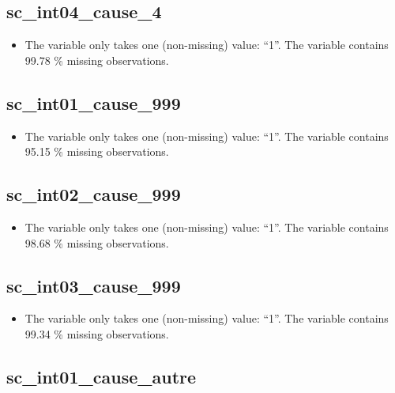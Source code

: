 \documentclass[
  letterpaper,
  DIV=11,
  numbers=noendperiod]{scrartcl}
\providecommand{\tightlist}{%
  \setlength{\itemsep}{0pt}\setlength{\parskip}{0pt}}
\begin{document}
\fullline

\subsection{sc\_int04\_cause\_4}\label{sc_int04_cause_4}

\begin{itemize}
\tightlist
\item
  The variable only takes one (non-missing) value: ``1''. The variable
  contains 99.78 \% missing observations.
\end{itemize}

\fullline

\subsection{sc\_int01\_cause\_999}\label{sc_int01_cause_999}

\begin{itemize}
\tightlist
\item
  The variable only takes one (non-missing) value: ``1''. The variable
  contains 95.15 \% missing observations.
\end{itemize}

\fullline

\subsection{sc\_int02\_cause\_999}\label{sc_int02_cause_999}

\begin{itemize}
\tightlist
\item
  The variable only takes one (non-missing) value: ``1''. The variable
  contains 98.68 \% missing observations.
\end{itemize}

\fullline

\subsection{sc\_int03\_cause\_999}\label{sc_int03_cause_999}

\begin{itemize}
\tightlist
\item
  The variable only takes one (non-missing) value: ``1''. The variable
  contains 99.34 \% missing observations.
\end{itemize}

\fullline

\subsection{sc\_int01\_cause\_autre}\label{sc_int01_cause_autre}
\end{document}
